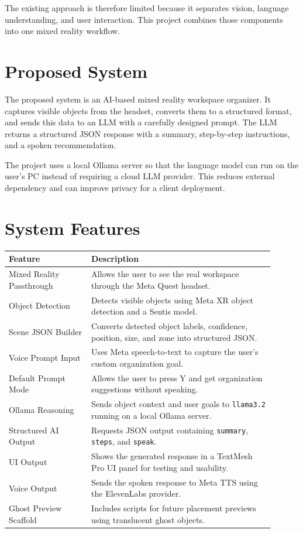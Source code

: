 \documentclass[12pt,a4paper]{article}
\begin{document}
The existing approach is therefore limited because it separates vision, language understanding, and user interaction. This project combines those components into one mixed reality workflow.

\section{Proposed System}

The proposed system is an AI-based mixed reality workspace organizer. It captures visible objects from the headset, converts them to a structured format, and sends this data to an LLM with a carefully designed prompt. The LLM returns a structured JSON response with a summary, step-by-step instructions, and a spoken recommendation.

The project uses a local Ollama server so that the language model can run on the user's PC instead of requiring a cloud LLM provider. This reduces external dependency and can improve privacy for a client deployment.

\section{System Features}

\begin{longtable}{p{0.28\linewidth} p{0.62\linewidth}}
\toprule
\textbf{Feature} & \textbf{Description}\\
\midrule
Mixed Reality Passthrough & Allows the user to see the real workspace through the Meta Quest headset.\\
Object Detection & Detects visible objects using Meta XR object detection and a Sentis model.\\
Scene JSON Builder & Converts detected object labels, confidence, position, size, and zone into structured JSON.\\
Voice Prompt Input & Uses Meta speech-to-text to capture the user's custom organization goal.\\
Default Prompt Mode & Allows the user to press Y and get organization suggestions without speaking.\\
Ollama Reasoning & Sends object context and user goals to \texttt{llama3.2} running on a local Ollama server.\\
Structured AI Output & Requests JSON output containing \texttt{summary}, \texttt{steps}, and \texttt{speak}.\\
UI Output & Shows the generated response in a TextMesh Pro UI panel for testing and usability.\\
Voice Output & Sends the spoken response to Meta TTS using the ElevenLabs provider.\\
Ghost Preview Scaffold & Includes scripts for future placement previews using translucent ghost objects.\\
\bottomrule
\end{longtable}
\end{document}
